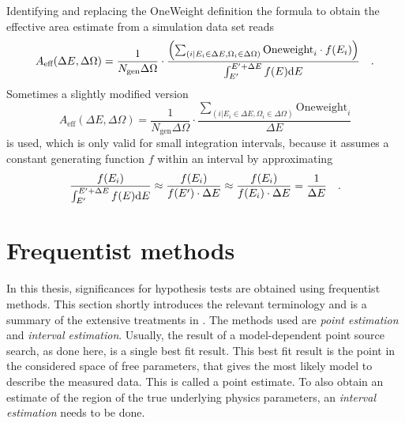 Identifying and replacing the OneWeight definition the formula to obtain the effective area estimate from a simulation data set reads
\begin{equation}
  A_\text{eff}(\Delta E, \Delta \Omega) =
    \frac{1}{N_\text{gen}\Delta\Omega}\cdot
    \frac{\left(
            \sum_{(i|E_i\in\Delta E, \Omega_i\in\Delta\Omega)}
            \text{Oneweight}_i \cdot f(E_i)
          \right)}
          {\int_{E'}^{E'+\Delta E}f(E)\mathrm{d}E}
  \quad\text{.}
\end{equation}
Sometimes a slightly modified version
\begin{equation}
  A_\text{eff}(\Delta E, \Delta \Omega) =
    \frac{1}{N_\text{gen}\Delta\Omega}\cdot
    \frac{\sum_{(i|E_i\in\Delta E, \Omega_i\in\Delta\Omega)}
          \text{Oneweight}_i}
         {\Delta E}
\end{equation}
is used, which is only valid for small integration intervals, because it assumes a constant generating function $f$ within an interval by approximating
\begin{equation}
  \frac{f(E_i)}{\int_{E'}^{E'+\Delta E}f(E)\mathrm{d}E}
  \approx \frac{f(E_i)}{f(E')\cdot\Delta E}
  \approx \frac{f(E_i)}{f(E_i)\cdot\Delta E}
  = \frac{1}{\Delta E}
  \quad\text{.}
\end{equation}


\section{Frequentist methods}
  \label{chp:pointsource_frequentist}
In this thesis, significances for hypothesis tests are obtained using frequentist methods.
This section shortly introduces the relevant terminology and is a summary of the extensive treatments in .
The methods used are \emph{point estimation} and \emph{interval estimation}.
Usually, the result of a model-dependent point source search, as done here, is a single best fit result.
This best fit result is the point in the considered space of free parameters, that gives the most likely model to describe the measured data.
This is called a point estimate.
To also obtain an estimate of the region of the true underlying physics parameters, an \emph{interval estimation} needs to be done.

